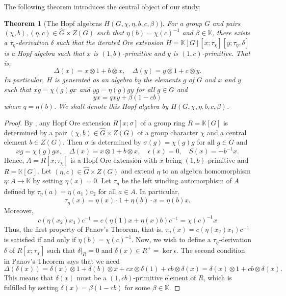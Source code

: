 \documentclass[11pt, twoside]{amsart}
\newtheorem{theorem}{Theorem}[section]
\theoremstyle{definition}
\newcommand{\KK}{\mathbb{K}}
\begin{document}
The following theorem introduces the central object of our study:
%
\begin{theorem}[The Hopf algebras $H(G, \chi, \eta, b, c, \beta)$]\label{theorem:introducing H}
    For a group $G$ and pairs $(\chi, b), (\eta, c) \in \widehat{G} \times Z(G)$ such that $\eta(b) = \chi(c)^{-1}$ and $\beta \in \KK$, there exists a $\tau_\eta$-derivation $\delta$ such that the iterated Ore extension $H = \KK[G][x; \tau_\chi][y; \tau_\eta, \delta]$ is a Hopf algebra such that $x$ is $(1, b)$-primitive and $y$ is $(1,c)$-primitive. That is, 
    \[\Delta(x) = x \otimes 1 + b \otimes x,\quad \Delta(y) = y \otimes 1 + c \otimes y.\]
    In particular, $H$ is generated as an algebra by the elements $g$ of $G$ and $x$ and $y$ such that $xg = \chi(g)gx$ and $yg = \eta(g)gy$ for all $g \in G$ and 
    \[yx = qxy + \beta(1 - cb)\]
    where $q = \eta(b)$. We shall denote this Hopf algebra by $H(G, \chi, \eta, b, c, \beta)$.
\end{theorem}
%
\begin{proof}
    By \cite[Proposition 2.2]{Panov}, any Hopf Ore extension $R[x; \sigma]$ of a group ring $R = \KK[G]$ is determined by a pair $(\chi, b) \in \widehat{G} \times Z(G)$ of a group character $\chi$ and a central element $b \in Z(G)$. Then $\sigma$ is determined by $\sigma(g) = \chi(g)g$ for all $g \in G$ and 
    \[xg = \chi(g)gx,\quad \Delta(x) = x \otimes 1 + b \otimes x,\quad \epsilon(x) = 0,\quad S(x) = -b^{-1}x.\]
    Hence, $A = R[x; \tau_\chi]$ is a Hopf Ore extension with $x$ being $(1,b)$-primitive and $R = \KK[G]$. Let $(\eta, c) \in \widehat{G} \times Z(G)$ and extend $\eta$ to an algebra homomorphism $\eta: A \to \KK$ by setting $\eta(x) = 0$. Let $\tau_\eta$ be the left winding automorphism of $A$ defined by $\tau_\eta(a) = \eta(a_1)a_2$ for all $a \in A$. In particular,
    \[\tau_\eta(x) = \eta(x)\cdot 1 + \eta(b) \cdot x = \eta(b)x.\]
    Moreover, 
    \[c(\eta(x_2)x_1)c^{-1} = c(\eta(1)x + \eta(x)b)c^{-1} = \chi(c)^{-1}x\]
    Thus, the first property of Panov's Theorem, that is, $\tau_\eta(x) = c(\eta(x_2)x_1)c^{-1} $ is satisfied if and only if $\eta(b) = \chi(c)^{-1}$. Now, we wish to define a $\tau_\eta$-derivation $\delta$ of $R[x; \tau_\chi]$ such that $\delta|_R = 0$ and $\delta(x) \in R^{+} = \ker\epsilon$. The second condition in Panov's Theorem says that we need
    \[\Delta(\delta(x)) = \delta(x) \otimes 1 + \delta(b) \otimes x + cx \otimes \delta(1) + cb \otimes \delta(x) = \delta(x) \otimes 1 + cb \otimes \delta(x).\]
    This means that $\delta(x)$ must be a $(1, cb)$-primitive element of $R$, which is fulfilled by setting $\delta(x) = \beta(1 - cb)$ for some $\beta \in \KK$.
\end{proof}
\end{document}

